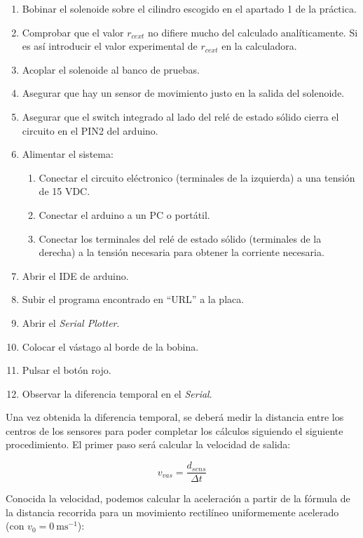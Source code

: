 \begin{enumerate}
    \item Bobinar el solenoide sobre el cilindro escogido en el apartado 1 de la práctica.
    \item Comprobar que el valor \(r_{cext}\) no difiere mucho del calculado analíticamente. Si es así introducir el valor experimental de \(r_{cext}\) en la calculadora.
    \item Acoplar el solenoide al banco de pruebas.
    \item Asegurar que hay un sensor de movimiento justo en la salida del solenoide.
    \item Asegurar que el switch integrado al lado del relé de estado sólido cierra el circuito en el PIN2 del arduino.
    \item Alimentar el sistema:
    \begin{enumerate}
        \item Conectar el circuito eléctronico (terminales de la izquierda) a una tensión de 15 VDC.
        \item Conectar el arduino a un PC o portátil.
        \item Conectar los terminales del relé de estado sólido (terminales de la derecha) a la tensión necesaria para obtener la corriente necesaria.
    \end{enumerate}
    \item Abrir el IDE de arduino.
    \item Subir el programa encontrado en ``URL'' a la placa.
    \item Abrir el \textit{Serial Plotter}.
    \item Colocar el vástago al borde de la bobina.
    \item Pulsar el botón rojo.
    \item Observar la diferencia temporal en el \textit{Serial}.
\end{enumerate}

Una vez obtenida la diferencia temporal, se deberá medir la distancia entre los centros de los sensores para poder completar los cálculos siguiendo el siguiente procedimiento. El primer paso será calcular la velocidad de salida:

\[v_{vas}=\frac{d_{sens}}{\Delta t}\]

Conocida la velocidad, podemos calcular la aceleración a partir de la fórmula de la distancia recorrida para un movimiento rectilíneo uniformemente acelerado (con \(v_0 = 0~\text{ms}^{-1}\)):

